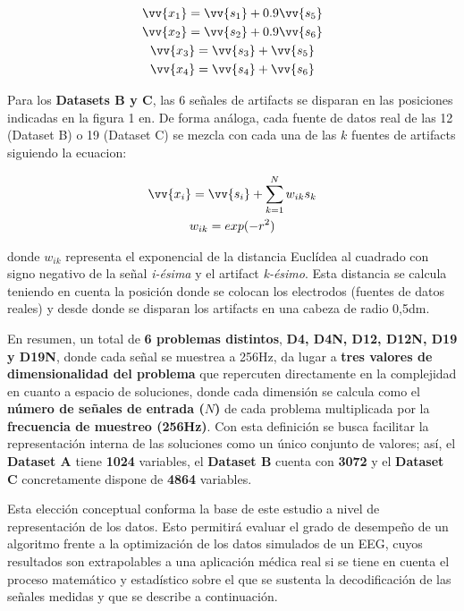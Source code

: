 \begin{equation}\label{eq:D4}
	\begin{gathered}
		\vv{x_1} = \vv{s_1} + 0.9\vv{s_5}\\
		\vv{x_2} = \vv{s_2} + 0.9\vv{s_6}\\
		\vv{x_3} = \vv{s_3} + \vv{s_5}\\
		\vv{x_4} = \vv{s_4} + \vv{s_6}\\
	\end{gathered}
\end{equation}

Para los \textbf{Datasets B y C}, las 6 señales de artifacts se disparan en las posiciones indicadas  en la figura 1 en\cite{EvolutionaryBigOpt}. De forma análoga, cada fuente de datos real de las 12 (Dataset B) o 19 (Dataset C) se mezcla con cada una de las $k$ fuentes de artifacts siguiendo la ecuacion:

\begin{equation}\label{eq:D12-9}
	\begin{gathered}
	\vv{x_i} = \vv{s_i} + \sum_{k=1}^{N} w_{ik} s_k\\
	w_{ik} = exp (-r^2)
	\end{gathered}
\end{equation}

donde $w_{ik}$ representa el exponencial de la distancia Euclídea al cuadrado con signo negativo de la señal \textit{i-ésima} y el artifact \textit{k-ésimo}. Esta distancia se calcula teniendo en cuenta la posición donde se colocan los electrodos (fuentes de datos reales) y desde donde se disparan los artifacts en una cabeza de radio 0,5dm.

En resumen, un total de \textbf{6 problemas distintos}, \textbf{D4, D4N, D12, D12N, D19 y D19N}, donde cada señal se muestrea a 256Hz, da lugar a \textbf{tres valores de dimensionalidad del problema} que repercuten directamente en la complejidad en cuanto a espacio de soluciones, donde cada dimensión se calcula como el \textbf{número de señales de entrada ($N$)} de cada problema multiplicada por la \textbf{frecuencia de muestreo (256Hz)}. Con esta definición se busca facilitar la representación interna de las soluciones como un único conjunto de valores; así, el \textbf{Dataset A} tiene \textbf{1024} variables, el \textbf{Dataset B} cuenta con \textbf{3072} y el \textbf{Dataset C} concretamente dispone de \textbf{4864} variables.

Esta elección conceptual conforma la base de este estudio a nivel de representación de los datos. Esto permitirá evaluar el grado de desempeño de un algoritmo frente a la optimización de los datos simulados de un EEG, cuyos resultados son extrapolables a una aplicación médica real si se tiene en cuenta el proceso matemático y estadístico sobre el que se sustenta la decodificación de las señales medidas y que se describe a continuación.

